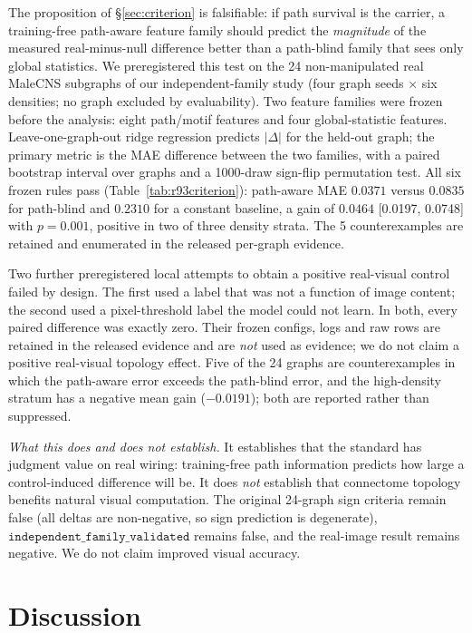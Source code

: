 \documentclass[10pt,twocolumn,letterpaper]{article}
\begin{document}
The proposition of \S\ref{sec:criterion} is falsifiable: if path survival is
the carrier, a training-free path-aware feature family should predict the
\emph{magnitude} of the measured real-minus-null difference better than a
path-blind family that sees only global statistics. We preregistered this test
on the 24 non-manipulated real MaleCNS subgraphs of our independent-family
study (four graph seeds $\times$ six densities; no graph excluded by
evaluability). Two feature families were frozen before the analysis: eight
path/motif features and four global-statistic features. Leave-one-graph-out
ridge regression predicts $|\Delta|$ for the held-out graph; the primary
metric is the MAE difference between the two families, with a paired bootstrap
interval over graphs and a 1000-draw sign-flip permutation test. All six
frozen rules pass (Table~\ref{tab:r93criterion}): path-aware MAE
$0.0371$ versus $0.0835$ for path-blind and $0.2310$ for a constant baseline,
a gain of $0.0464$ [0.0197, 0.0748] with $p=0.001$, positive in two of three
density strata. The 5 counterexamples are retained and enumerated in the released per-graph evidence.

Two further preregistered local attempts to obtain a positive real-visual
control failed by design. The first used a label that was not a function of
image content; the second used a pixel-threshold label the model could not
learn. In both, every paired difference was exactly zero. Their frozen
configs, logs and raw rows are retained in the released evidence and are
\emph{not} used as evidence; we do not claim a positive real-visual topology
effect. Five of the 24 graphs are counterexamples in which the path-aware
error exceeds the path-blind error, and the high-density stratum has a
negative mean gain ($-0.0191$); both are reported rather than suppressed.

\emph{What this does and does not establish.} It establishes that the standard
has judgment value on real wiring: training-free path information predicts how
large a control-induced difference will be. It does \emph{not} establish that
connectome topology benefits natural visual computation. The original
24-graph sign criteria remain false (all deltas are non-negative, so sign
prediction is degenerate), $\texttt{independent\_family\_validated}$ remains
false, and the real-image result remains negative. We do not claim improved
visual accuracy.

\section{Discussion}
\label{sec:discussion}
\end{document}
